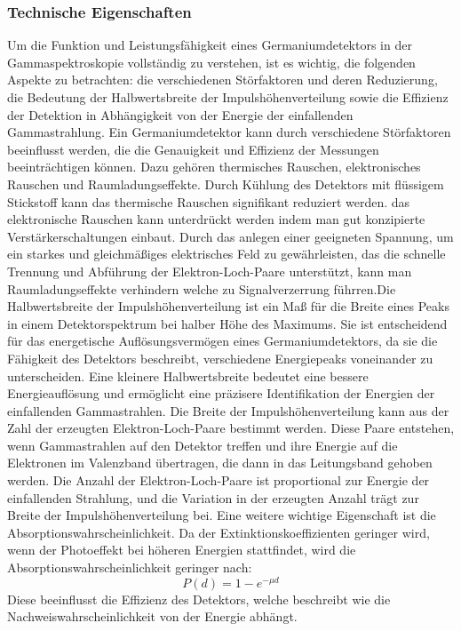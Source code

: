 \subsubsection{Technische Eigenschaften}
Um die Funktion und Leistungsfähigkeit eines Germaniumdetektors in der Gammaspektroskopie vollständig zu verstehen, ist es wichtig, die folgenden Aspekte zu betrachten: 
die verschiedenen Störfaktoren und deren Reduzierung, die Bedeutung der Halbwertsbreite der Impulshöhenverteilung sowie die Effizienz der Detektion in Abhängigkeit von der Energie
der einfallenden Gammastrahlung.
Ein Germaniumdetektor kann durch verschiedene Störfaktoren beeinflusst werden, die die Genauigkeit und Effizienz der Messungen beeinträchtigen können.
Dazu gehören thermisches Rauschen, elektronisches Rauschen und Raumladungseffekte. Durch Kühlung des Detektors mit flüssigem Stickstoff kann das thermische
Rauschen signifikant reduziert werden. das elektronische Rauschen kann unterdrückt werden indem man gut konzipierte Verstärkerschaltungen einbaut. Durch das 
anlegen einer geeigneten Spannung, um ein starkes und gleichmäßiges elektrisches Feld zu gewährleisten, das die schnelle Trennung und Abführung der Elektron-Loch-Paare
unterstützt, kann man Raumladungseffekte verhindern welche zu Signalverzerrung führren.Die Halbwertsbreite der Impulshöhenverteilung ist ein Maß für die Breite eines Peaks 
in einem Detektorspektrum bei halber Höhe des Maximums. Sie ist entscheidend für das energetische Auflösungsvermögen eines Germaniumdetektors, da sie die Fähigkeit des Detektors
beschreibt, verschiedene Energiepeaks voneinander zu unterscheiden. Eine kleinere Halbwertsbreite bedeutet eine bessere Energieauflösung und ermöglicht eine präzisere
Identifikation der Energien der einfallenden Gammastrahlen.
Die Breite der Impulshöhenverteilung kann aus der Zahl der erzeugten Elektron-Loch-Paare bestimmt werden. Diese Paare entstehen, wenn Gammastrahlen auf den Detektor
treffen und ihre Energie auf die Elektronen im Valenzband übertragen, die dann in das Leitungsband gehoben werden. Die Anzahl der Elektron-Loch-Paare ist proportional 
zur Energie der einfallenden Strahlung, und die Variation in der erzeugten Anzahl trägt zur Breite der Impulshöhenverteilung bei.
Eine weitere wichtige Eigenschaft ist die Absorptionswahrscheinlichkeit. Da der Extinktionskoeffizienten geringer wird, wenn der Photoeffekt bei höheren Energien stattfindet,
wird die Absorptionswahrscheinlichkeit geringer nach:
\begin{equation}
    P(d)=1-e^{-\mu d}
\end{equation}    
Diese beeinflusst die Effizienz des Detektors, welche beschreibt wie die Nachweiswahrscheinlichkeit von der Energie abhängt.

